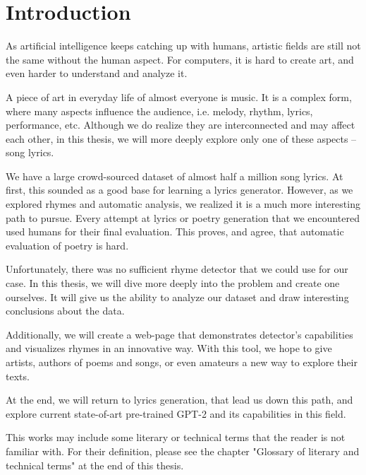 \chapter*{Introduction}

As artificial intelligence keeps catching up with humans, artistic fields are still not the same without the human aspect.
For computers, it is hard to create art, and even harder to understand and analyze it. 

A piece of art in everyday life of almost everyone is music. It is a complex form, where many aspects influence the audience, i.e. melody, rhythm, lyrics, performance, etc. Although we do realize they are interconnected and may affect each other, in this thesis, we will more deeply explore only one of these aspects -- song lyrics. 

We have a large crowd-sourced dataset of almost half a million song lyrics. At first, this sounded as a good base for learning a lyrics generator. However, as we explored rhymes and automatic analysis, we realized it is a much more interesting path to pursue. Every attempt at lyrics or poetry generation that we encountered used humans for their final evaluation. This proves, and \cite{greene2010automatic} agree, that automatic evaluation of poetry is hard.

Unfortunately, there was no sufficient rhyme detector that we could use for our case. In this thesis, we will dive more deeply into the problem and create one ourselves. It will give us the ability to analyze our dataset and draw interesting conclusions about the data. 

Additionally, we will create a web-page that demonstrates detector's capabilities and visualizes rhymes in an innovative way. With this tool, we hope to give artists, authors of poems and songs, or even amateurs a new way to explore their texts.

At the end, we will return to lyrics generation, that lead us down this path,
and explore current state-of-art
pre-trained GPT-2  and its capabilities in this field.

This works may include some literary or technical terms that the reader is not familiar with. For their definition, please see the chapter "Glossary of literary and technical terms" at the end of this thesis.


